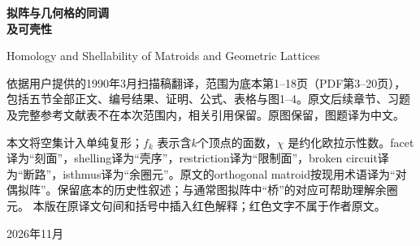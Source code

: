 \documentclass[UTF8,11pt,a4paper,fontset=windows]{ctexart}
\newcommand{\redinsert}[1]{{\color{red}#1}}
\begin{document}
\begin{titlepage}\centering\vspace*{25mm}
{\Huge\bfseries 拟阵与几何格的同调\\[4mm]及可壳性\par}\vspace{10mm}
{\large Homology and Shellability of Matroids and Geometric Lattices\par}
\vspace{15mm}{\Large Anders Björner\par}
\vspace{15mm}{\LARGE 第7.1--7.5节中文译本（附解释版）\par}\vfill
\begin{minipage}{.9\textwidth}\small
依据用户提供的1990年3月扫描稿翻译，范围为底本第1--18页（PDF第3--20页），包括五节全部正文、编号结果、证明、公式、表格与图1--4。原文后续章节、习题及完整参考文献表不在本次范围内，相关引用保留。原图保留，图题译为中文。

本文将空集计入单纯复形；$f_k$ 表示含$k$个顶点的面数，$\chi$ 是约化欧拉示性数。facet译为“刻面”，shelling译为“壳序”，restriction译为“限制面”，broken circuit译为“断路”，isthmus译为“余圈元”。原文的orthogonal matroid按现用术语译为“对偶拟阵”。保留底本的历史性叙述；与通常图拟阵中“桥”的对应可帮助理解余圈元。
\redinsert{本版在原译文句间和括号中插入红色解释；红色文字不属于作者原文。}
\end{minipage}\vspace{10mm}\par 2026年11月
\end{titlepage}
\tableofcontents\clearpage





\end{document}
